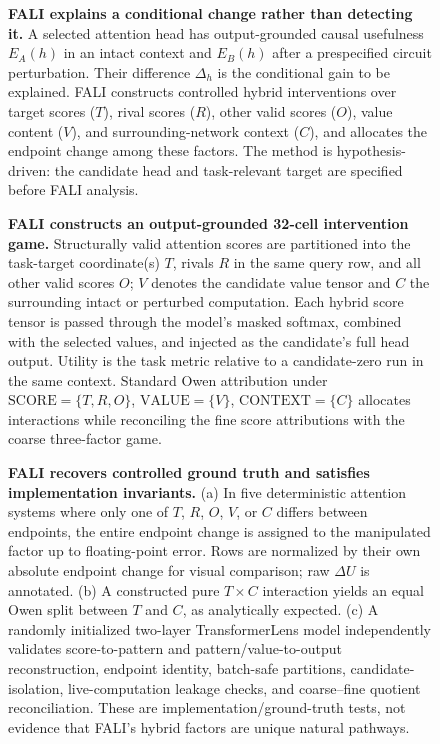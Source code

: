 
\begin{figure}[t]
  \centering
  \caption{\textbf{FALI explains a conditional change rather than detecting it.}
  A selected attention head has output-grounded causal usefulness $E_A(h)$ in an intact context and $E_B(h)$ after a prespecified circuit perturbation.
  Their difference $\Delta_h$ is the conditional gain to be explained.
  FALI constructs controlled hybrid interventions over target scores ($T$), rival scores ($R$), other valid scores ($O$), value content ($V$), and surrounding-network context ($C$), and allocates the endpoint change among these factors.
  The method is hypothesis-driven: the candidate head and task-relevant target are specified before FALI analysis.}
  \label{fig:fali-overview}
\end{figure}

\begin{figure}[t]
  \centering
  \caption{\textbf{FALI constructs an output-grounded 32-cell intervention game.}
  Structurally valid attention scores are partitioned into the task-target coordinate(s) $T$, rivals $R$ in the same query row, and all other valid scores $O$; $V$ denotes the candidate value tensor and $C$ the surrounding intact or perturbed computation.
  Each hybrid score tensor is passed through the model's masked softmax, combined with the selected values, and injected as the candidate's full head output.
  Utility is the task metric relative to a candidate-zero run in the same context.
  Standard Owen attribution under $\mathrm{SCORE}=\{T,R,O\}$, $\mathrm{VALUE}=\{V\}$, $\mathrm{CONTEXT}=\{C\}$ allocates interactions while reconciling the fine score attributions with the coarse three-factor game.}
  \label{fig:fali-game}
\end{figure}

\begin{figure}[t]
  \centering
  \caption{\textbf{FALI recovers controlled ground truth and satisfies implementation invariants.}
  (a) In five deterministic attention systems where only one of $T$, $R$, $O$, $V$, or $C$ differs between endpoints, the entire endpoint change is assigned to the manipulated factor up to floating-point error.
  Rows are normalized by their own absolute endpoint change for visual comparison; raw $\Delta U$ is annotated.
  (b) A constructed pure $T\times C$ interaction yields an equal Owen split between $T$ and $C$, as analytically expected.
  (c) A randomly initialized two-layer TransformerLens model independently validates score-to-pattern and pattern/value-to-output reconstruction, endpoint identity, batch-safe partitions, candidate-isolation, live-computation leakage checks, and coarse--fine quotient reconciliation.
  These are implementation/ground-truth tests, not evidence that FALI's hybrid factors are unique natural pathways.}
  \label{fig:validation}
\end{figure}

